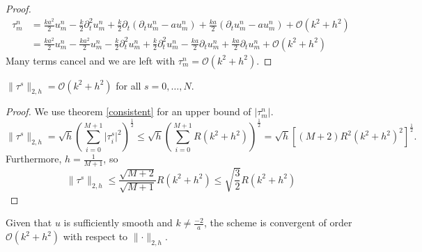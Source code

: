 \begin{proof}
    \begin{align*}
      \tau_m^n &= \frac{ka^2}{2}u_{m}^{n}  - \frac{k}{2} \partial_t^2 u_{m}^{n} + \frac{k}{2} \partial_t \left(\partial_t u_{m}^{n}   - au_{m}^{n} \right) + \frac{ka}{2} \left( \partial_t  u_{m}^{n} - a u_{m}^{n}\right)+ \mathcal{O}(k^2 + h^2) \\
                                                                                  &= \frac{ka^2}{2}u_{m}^{n} - \frac{ka^2}{2}u_{m}^{n}  - \frac{k}{2} \partial_t^2 u_{m}^{n} + \frac{k}{2} \partial_t^2 u_{m}^{n} - \frac{ka}{2} \partial_t u_{m}^{n} + \frac{ka}{2} \partial_t  u_{m}^{n}+ \mathcal{O}(k^2 + h^2)
    \end{align*}
    Many terms cancel and we are left with \( \tau_m^n = \mathcal{O}(k^2 + h^2) \).
\end{proof}

\begin{corollary}
    \label{corollary:norm_tau}
    $\lVert\tau^s \rVert_{2, h} =\mathcal{O}(k^2 + h^2)$ for all \( s = 0, \dots, N \).
\end{corollary}

\begin{proof}
We use theorem \ref{consistent} for an upper bound of $\lvert \tau_m^n\lvert$.
    $$
    \lVert\tau^s \lVert_{2, h} = \sqrt{h}\left( \sum_{i=0}^{M+1} \lvert\tau^s_i \lvert^2 \right)^\frac{1}{2} \leq \sqrt{h}\left( \sum_{i=0}^{M+1} R(k^2 + h^2) \right)^\frac{1}{2} = \sqrt{h}\left[ (M+2) R^2(k^2+h^2)^2 \right]^\frac{1}{2}.
    $$
    Furthermore, $h = \frac{1}{M+1}$, so
    $$\lVert\tau^s \lVert_{2, h}
      \le \frac{\sqrt{M+2}}{\sqrt{M+1}}R(k^2+h^2)
      \le \sqrt{ \frac{3}{2}} R(k^2+h^2) 
    $$
\end{proof}

\begin{theorem}
  \label{thm:conv_order}
    Given that $u$ is sufficiently smooth and $k \neq \frac{-2}{a}$, the scheme is convergent of order $ \mathcal{O}(k^2+h^2)$ with respect to $\lVert\cdot \lVert_{2, h}$.
\end{theorem}

